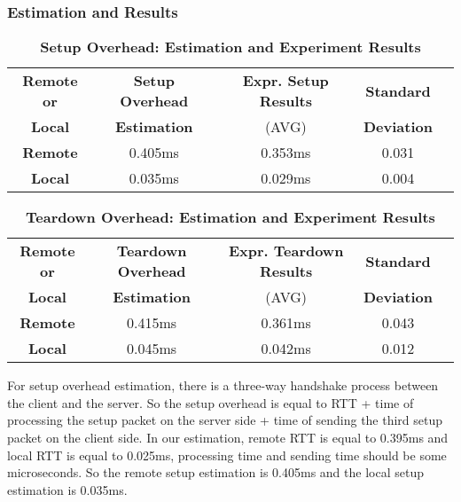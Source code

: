 \subsubsection{Estimation and Results}

\begin{table}[ht]
  \centering
  \caption{\textbf{Setup Overhead: Estimation and Experiment Results}}
  \begin{threeparttable}
  \begin{tabular}{ccccc}
  \hline
      \textbf{Remote or} & \textbf{Setup Overhead}  & \textbf{Expr. Setup Results} & \textbf{Standard} \\ 
      \textbf{Local}  & \textbf{Estimation}  & (AVG)   & \textbf{Deviation} \\
  \hline
      \textbf{Remote}  & 0.405ms & 0.353ms & 0.031 \\
      \textbf{Local} & 0.035ms & 0.029ms & 0.004 \\
  \hline
  \end{tabular}
  \end{threeparttable}
  \label{setup_overhead_table}
\end{table}

\begin{table}[ht]
  \centering
  \caption{\textbf{Teardown Overhead: Estimation and Experiment Results}}
  \begin{threeparttable}
  \begin{tabular}{ccccc}
  \hline
      \textbf{Remote or} & \textbf{Teardown Overhead}  & \textbf{Expr. Teardown Results} & \textbf{Standard} \\ 
      \textbf{Local}  & \textbf{Estimation}  & (AVG)   & \textbf{Deviation} \\
  \hline
      \textbf{Remote}  & 0.415ms & 0.361ms & 0.043 \\
      \textbf{Local} & 0.045ms & 0.042ms & 0.012 \\
  \hline
  \end{tabular}
  \end{threeparttable}
  \label{setup_table}
\end{table}

For setup overhead estimation, there is a three-way handshake process between the client and the server. So the setup overhead is equal to RTT + time of processing the setup packet on the server side + time of sending the third setup packet on the client side. In our estimation, remote RTT is equal to 0.395ms and local RTT is equal to 0.025ms, processing time and sending time should be some microseconds. So the remote setup estimation is 0.405ms and the local setup estimation is 0.035ms.

